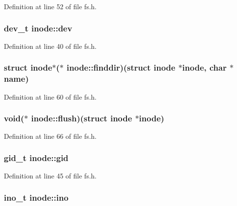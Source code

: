 Definition at line 52 of file fs.\+h.

\hypertarget{structinode_a127a2eb030df332fa64a81188731ad6b}{
\subsubsection[{dev}]{\setlength{\rightskip}{0pt plus 5cm}dev\+\_\+t inode\+::dev}}\label{structinode_a127a2eb030df332fa64a81188731ad6b}


Definition at line 40 of file fs.\+h.

\hypertarget{structinode_ab6c5e2d912fdbd506086e53185cd370d}{
\subsubsection[{finddir}]{\setlength{\rightskip}{0pt plus 5cm}struct {\bf inode}$\ast$($\ast$ inode\+::finddir)(struct {\bf inode} $\ast${\bf inode}, char $\ast${\bf name})}}\label{structinode_ab6c5e2d912fdbd506086e53185cd370d}


Definition at line 60 of file fs.\+h.

\hypertarget{structinode_ae2972ef183f5c39aac7cb83b9f8a04a8}{
\subsubsection[{flush}]{\setlength{\rightskip}{0pt plus 5cm}void($\ast$ inode\+::flush)(struct {\bf inode} $\ast${\bf inode})}}\label{structinode_ae2972ef183f5c39aac7cb83b9f8a04a8}


Definition at line 66 of file fs.\+h.

\hypertarget{structinode_a8434fb9dd05057d00b37ed713713835d}{
\subsubsection[{gid}]{\setlength{\rightskip}{0pt plus 5cm}gid\+\_\+t inode\+::gid}}\label{structinode_a8434fb9dd05057d00b37ed713713835d}


Definition at line 45 of file fs.\+h.

\hypertarget{structinode_a1a77be0f24a6c9a18bbdbcecfb75df7c}{
\subsubsection[{ino}]{\setlength{\rightskip}{0pt plus 5cm}ino\+\_\+t inode\+::ino}}\label{structinode_a1a77be0f24a6c9a18bbdbcecfb75df7c}


